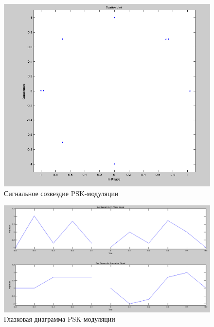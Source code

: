 \begin{figure}[H]
\includegraphics[width=150mm, scale = 0.9]{lab9/9_5}
   \caption{Сигнальное созвездие PSK-модуляции}
\end{figure}



\begin{figure}[H]
\includegraphics[width=150mm, scale = 0.9]{lab9/9_6}
   \caption{Глазковая диаграмма PSK-модуляции}
\end{figure}



